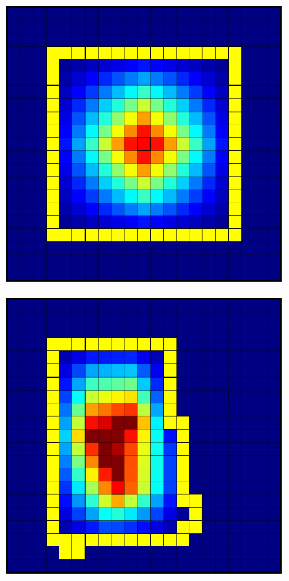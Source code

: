 \begin{figure}[htbp]
\begin{subfigure}[t]{0.3\textwidth}
  \end{subfigure}
  \par\bigskip
  \begin{subfigure}[t]{0.3\textwidth}
    \centerline{\includegraphics[width=0.9\linewidth]{figs/square_cart_struct_cell_conv}}
  \end{subfigure}
  \hfill
  \begin{subfigure}[t]{0.3\textwidth}
    \centerline{\includegraphics[width=0.9\linewidth]{figs/square_cart_metis_cell_conv}}

\end{subfigure}
\end{figure}
